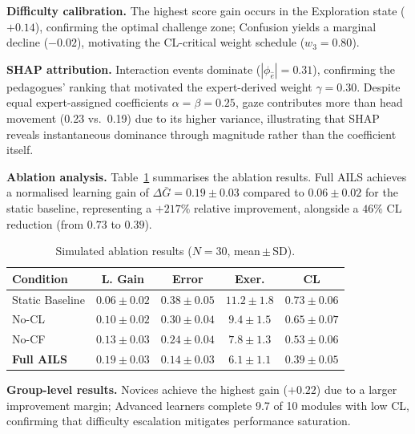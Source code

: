 \documentclass[ASNA,twocolumn]{USG} %
\begin{document}
\textbf{Difficulty calibration.} The highest score gain occurs in the
Exploration state ($+0.14$), confirming the optimal challenge zone;
Confusion yields a marginal decline ($-0.02$), motivating the
CL-critical weight schedule ($w_3{=}0.80$).

\textbf{SHAP attribution.} Interaction events dominate
($|\phi_{\hat{e}}|{=}0.31$), confirming the pedagogues' ranking that
motivated the expert-derived weight $\gamma{=}0.30$.
Despite equal expert-assigned coefficients $\alpha{=}\beta{=}0.25$,
gaze contributes more than head movement (0.23 vs.\ 0.19) due to its
higher variance,
illustrating that SHAP reveals instantaneous dominance through
magnitude rather than the coefficient itself.

\textbf{Ablation analysis.} Table~\ref{tab:ablation_sim} summarises
the ablation results. Full AILS achieves a normalised learning gain
of $\Delta\bar{G}{=}0.19{\pm}0.03$ compared to $0.06{\pm}0.02$ for
the static baseline, representing a $+217\%$ relative improvement,
alongside a $46\%$ CL reduction (from $0.73$ to $0.39$).

\begin{table}[ht]
\caption{Simulated ablation results ($N{=}30$, mean\,$\pm$\,SD).}
\label{tab:ablation_sim}
\begin{tabular}{lcccc}
\toprule
\textbf{Condition}
  & \textbf{L. Gain}
  & \textbf{Error}
  & \textbf{Exer.}
  & \textbf{CL} \\
\midrule
Static Baseline
  & $0.06{\pm}0.02$ & $0.38{\pm}0.05$
  & $11.2{\pm}1.8$  & $0.73{\pm}0.06$ \\
No-CL
  & $0.10{\pm}0.02$ & $0.30{\pm}0.04$
  & $9.4{\pm}1.5$   & $0.65{\pm}0.07$ \\
No-CF
  & $0.13{\pm}0.03$ & $0.24{\pm}0.04$
  & $7.8{\pm}1.3$   & $0.53{\pm}0.06$ \\
\textbf{Full AILS}
  & $\mathbf{0.19{\pm}0.03}$
  & $\mathbf{0.14{\pm}0.03}$
  & $\mathbf{6.1{\pm}1.1}$
  & $\mathbf{0.39{\pm}0.05}$ \\
\bottomrule
\end{tabular}
\end{table}

\textbf{Group-level results.} Novices achieve the highest gain
($+0.22$) due to a larger improvement margin; Advanced learners
complete 9.7 of 10 modules with low CL, confirming that difficulty
escalation mitigates performance saturation.
\end{document}
